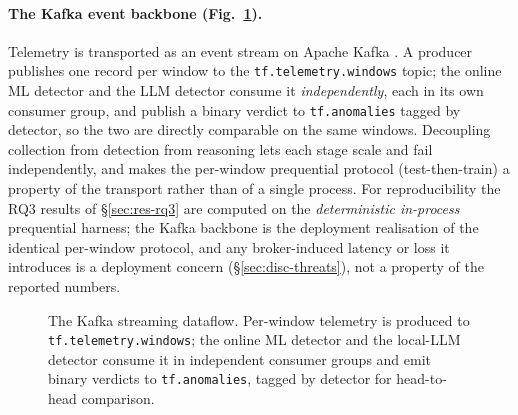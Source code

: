 \documentclass[pdflatex,sn-mathphys-num]{sn-jnl}%
\theoremstyle{thmstyleone}%
\theoremstyle{thmstyletwo}%
\theoremstyle{thmstylethree}%
\begin{document}
\paragraph{The Kafka event backbone (Fig.~\ref{fig:dataflow}).} Telemetry is transported as an event stream on Apache Kafka \cite{kreps2011kafka}. A producer publishes one record per window to the \texttt{tf.telemetry.windows} topic; the online ML detector and the LLM detector consume it \emph{independently}, each in its own consumer group, and publish a binary verdict to \texttt{tf.anomalies} tagged by detector, so the two are directly comparable on the same windows. Decoupling collection from detection from reasoning lets each stage scale and fail independently, and makes the per-window prequential protocol (test-then-train) a property of the transport rather than of a single process. For reproducibility the RQ3 results of \S\ref{sec:res-rq3} are computed on the \emph{deterministic in-process} prequential harness; the Kafka backbone is the deployment realisation of the identical per-window protocol, and any broker-induced latency or loss it introduces is a deployment concern (\S\ref{sec:disc-threats}), not a property of the reported numbers.

\begin{figure}[t]
\centering
{}
\caption{The Kafka streaming dataflow. Per-window telemetry is produced to
\texttt{tf.telemetry.windows}; the online ML detector and the local-LLM detector
consume it in independent consumer groups and emit binary verdicts to
\texttt{tf.anomalies}, tagged by detector for head-to-head comparison.}\label{fig:dataflow}
\end{figure}
\end{document}
